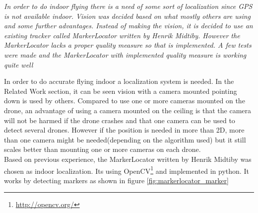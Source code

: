 \textit{In order to do indoor flying there is a need of some sort of localization since GPS is not available indoor. Vision was decided based on what mostly others are using and some further advantages. Instead of making the vision, it is decided to use an existing tracker called MarkerLocator written by Henrik Midtiby. However the MarkerLocator lacks a proper quality measure so that is implemented. A few tests were made and the MarkerLocator with implemented quality measure is working quite well}


In order to do accurate flying indoor a localization system is needed. In the Related Work section, it can be seen vision with a camera mounted pointing down is used by others. Compared to use one or more cameras mounted on the drone, an advantage of using a camera mounted on the ceiling is that the camera will not be harmed if the drone crashes and that one camera can be used to detect several drones. However if the position is needed in more than 2D, more than one camera might be needed(depending on the algorithm used) but it still scales better than mounting one or more cameras on each drone. \\

Based on previous experience, the MarkerLocator written by Henrik Midtiby was chosen as indoor localization. Its using OpenCV\footnote{\url{http://opencv.org/}} and implemented in python. It works by detecting markers as shown in figure \ref{fig:markerlocator_marker}



